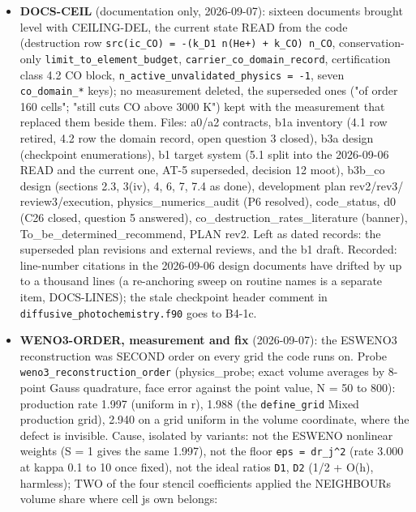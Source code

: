 \documentclass[english,a4paper]{my_memo}
\begin{document}
\begin{itemize}
  ceiling as present. The domain record is not checkpointed (a statement
  about the state, valid whether or not the step is accepted), unlike the
  ceiling record it replaces.
\item
  \textbf{DOCS-CEIL} (documentation only, 2026-09-07): sixteen documents brought
  level with CEILING-DEL, the current state READ from the code (destruction
  row \texttt{src(ic\_CO)\ =\ -(k\_D1\ n(He+)\ +\ k\_CO)\ n\_CO}, conservation-only
  \texttt{limit\_to\_element\_budget}, \texttt{carrier\_co\_domain\_record}, certification class
  4.2 CO block, \texttt{n\_active\_unvalidated\_physics\ =\ -1}, seven \texttt{co\_domain\_*}
  keys); no measurement deleted, the superseded ones ("of order 160 cells";
  "still cuts CO above 3000 K") kept with the measurement that replaced them
  beside them. Files: a0/a2 contracts, b1a inventory (4.1 row retired, 4.2
  row the domain record, open question 3 closed), b3a design (checkpoint
  enumerations), b1 target system (5.1 split into the 2026-09-06 READ and
  the current one, AT-5 superseded, decision 12 moot), b3b\_co design
  (sections 2.3, 3(iv), 4, 6, 7, 7.4 as done), development plan rev2/rev3/
  review3/execution, physics\_numerics\_audit (P6 resolved), code\_status, d0
  (C26 closed, question 5 answered), co\_destruction\_rates\_literature
  (banner), To\_be\_determined\_recommend, PLAN rev2. Left as dated records:
  the superseded plan revisions and external reviews, and the b1 draft.
  Recorded: line-number citations in the 2026-09-06 design documents have
  drifted by up to a thousand lines (a re-anchoring sweep on routine names
  is a separate item, DOCS-LINES); the stale checkpoint header comment in
  \texttt{diffusive\_photochemistry.f90} goes to B4-1c.
\item
  \textbf{WENO3-ORDER, measurement and fix} (2026-09-07): the ESWENO3
  reconstruction was SECOND order on every grid the code runs on. Probe
  \texttt{weno3\_reconstruction\_order} (physics\_probe; exact volume averages by
  8-point Gauss quadrature, face error against the point value, N = 50 to
  800): production rate 1.997 (uniform in r), 1.988 (the \texttt{define\_grid} Mixed
  production grid), 2.940 on a grid uniform in the volume coordinate, where
  the defect is invisible. Cause, isolated by variants: not the ESWENO
  nonlinear weights (S = 1 gives the same 1.997), not the floor \texttt{eps\ =\ dr\_j\^{}2} (rate 3.000 at kappa 0.1 to 10 once fixed), not the ideal ratios
  \texttt{D1}, \texttt{D2} (1/2 + O(h), harmless); TWO of the four stencil coefficients
  applied the NEIGHBOUR\textquotesingle s volume share where cell j\textquotesingle s own belongs:

\end{itemize}
\end{document}
